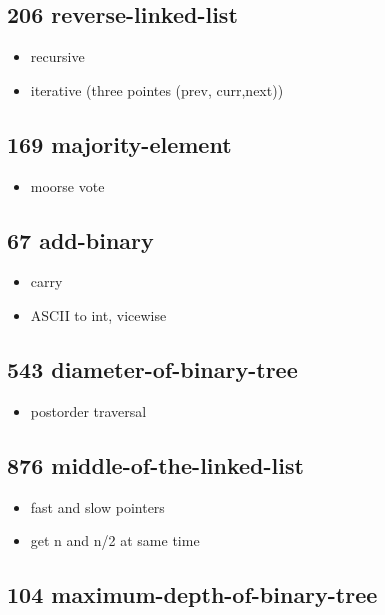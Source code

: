 \subsection{206 reverse-linked-list}

\begin{itemize}
	\item recursive
	\item iterative (three pointes (prev, curr,next))
\end{itemize}

\subsection{169 majority-element}

\begin{itemize}
	\item moorse vote
\end{itemize}

\subsection{67 add-binary}

\begin{itemize}
	\item carry
	\item ASCII to int, vicewise
\end{itemize}

\subsection{543 diameter-of-binary-tree}

\begin{itemize}
	\item postorder traversal
\end{itemize}

\subsection{876 middle-of-the-linked-list}

\begin{itemize}
	\item fast and slow pointers
	\item get n and n/2 at same time
\end{itemize}

\subsection{104 maximum-depth-of-binary-tree}

